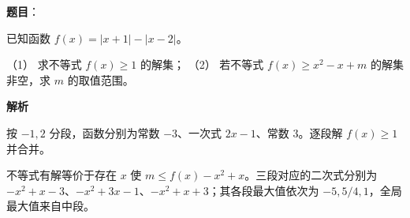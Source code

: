 \begin{answer}

\textbf{题目}：

已知函数 \(f(x)=|x+1|-|x-2|\)。

（1） 求不等式 \(f(x)\geq 1\) 的解集；
（2） 若不等式 \(f(x)\geq x^2-x+m\) 的解集非空，求 \(m\) 的取值范围。

\textbf{解析}


按 \(-1,2\) 分段，函数分别为常数 \(-3\)、一次式 \(2x-1\)、常数 \(3\)。逐段解 \(f(x)\ge1\) 并合并。


不等式有解等价于存在 \(x\) 使 \(m\le f(x)-x^2+x\)。三段对应的二次式分别为 \(-x^2+x-3\)、\(-x^2+3x-1\)、\(-x^2+x+3\)；其各段最大值依次为 \(-5,5/4,1\)，全局最大值来自中段。

\gkanswer{答案（1）：\([1,+\infty)\)（D）}


\end{answer}